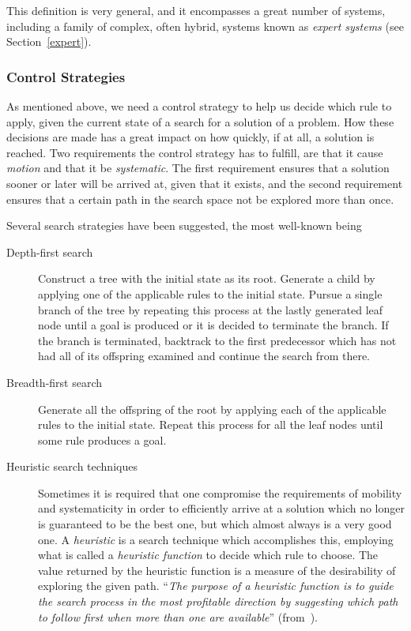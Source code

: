 This definition is very general, and it encompasses a great number of
systems, including a family of complex, often hybrid, systems known as
{\em expert systems\/} (see Section~\ref{expert}).

\subsubsection{Control Strategies}

As mentioned above, we need a control strategy to help us decide which
rule to apply, given the current state of a search for a solution of a
problem. How these decisions are made has a great impact on how
quickly, if at all, a solution is reached. Two requirements the
control strategy has to fulfill, are that it cause {\em motion\/} and
that it be {\em systematic\/}. The first requirement ensures that a
solution sooner or later will be arrived at, given that it exists, and
the second requirement ensures that a certain path in the search space
not be explored more than once.

Several search strategies have been suggested, the most well-known
being

\begin{description}
  \item[Depth-first search] Construct a tree with the initial
    state as its root. Generate a child by applying one of the
    applicable rules to the initial state. Pursue a single branch of
    the tree by repeating this process at the lastly generated leaf
    node until a goal is produced or it is decided to terminate the
    branch. If the branch is terminated, backtrack to the first
    predecessor which has not had all of its offspring examined and
    continue the search from there.
  \item[Breadth-first search] Generate all the offspring of the
    root by applying each of the applicable rules to the initial
    state.  Repeat this process for all the leaf nodes until some rule
    produces a goal.
  \item[Heuristic search techniques] Sometimes it is required that
    one compromise the requirements of mobility and systematicity in
    order to efficiently arrive at a solution which no longer is
    guaranteed to be the best one, but which almost always is a very
    good one. A {\em heuristic\/} is a search technique which
    accomplishes this, employing what is called a {\em heuristic
    function\/} to decide which rule to choose. The value returned by
    the heuristic function is a measure of the desirability of
    exploring the given path. ``{\em The purpose of a heuristic
    function is to guide the search process in the most profitable
    direction by suggesting which path to follow first when more than
    one are available}'' (from~\cite{rich}).
\end{description}

